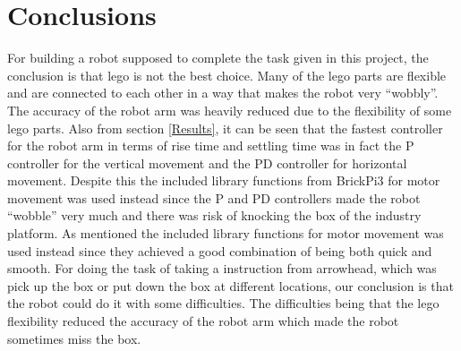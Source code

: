 \section{Conclusions}
For building a robot supposed to complete the task given in this project, the conclusion is that lego is not the best choice. Many of the lego parts are flexible and are connected to each other in a way that makes the robot very ``wobbly''. The accuracy of the robot arm was heavily reduced due to the flexibility of some lego parts. Also from section \ref{Results}, it can be seen that the fastest controller for the robot arm in terms of rise time and settling time was in fact the P controller for the vertical movement and the PD controller for horizontal movement. Despite this the included library functions from BrickPi3 for motor movement was used instead since the P and PD controllers made the robot ``wobble'' very much and there was risk of knocking the box of the industry platform. As mentioned the included library functions for motor movement was used instead since they achieved a good combination of being both quick and smooth.
For doing the task of taking a instruction from arrowhead, which was pick up the box or put down the box at different locations, our conclusion is that the robot could do it with some difficulties. The difficulties being that the lego flexibility reduced the accuracy of the robot arm which made the robot sometimes miss the box.
